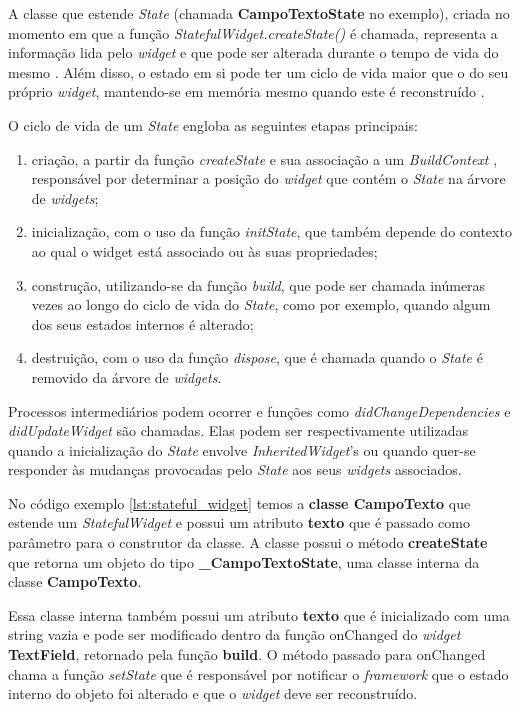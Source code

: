 A classe que estende \textit{State} (chamada \textbf{CampoTextoState} no exemplo), criada no momento em que a função \textit{StatefulWidget.createState()} é chamada, representa a informação lida pelo \textit{widget} e que pode ser alterada durante o tempo de vida do mesmo \cite{flutter2022stateful}. Além disso, o estado em si pode ter um ciclo de vida maior que o do seu próprio \textit{widget}, mantendo-se em memória mesmo quando este é reconstruído \cite{Faust2020}.

O ciclo de vida de um \textit{State} engloba as seguintes etapas principais:

\begin{enumerate}
  \item criação, a partir da função \textit{createState} e sua associação a um \textit{BuildContext} \cite{flutter2022buildcontext}, responsável por determinar a posição do \textit{widget} que contém o \textit{State} na árvore de \textit{widgets};
  \item inicialização, com o uso da função \textit{initState}, que também depende do contexto ao qual o widget está associado ou às suas propriedades;
  \item construção, utilizando-se da função \textit{build}, que pode ser chamada inúmeras vezes ao longo do ciclo de vida do \textit{State}, como por exemplo, quando algum dos seus estados internos é alterado;
  \item destruição, com o uso da função \textit{dispose}, que é chamada quando o \textit{State} \cite{flutter2022state} é removido da árvore de \textit{widgets}.
\end{enumerate}

Processos intermediários podem ocorrer e funções como \textit{didChangeDependencies} e \textit{didUpdateWidget} são chamadas. Elas podem ser respectivamente utilizadas quando a inicialização do \textit{State} envolve \textit{InheritedWidget}'s ou quando quer-se responder às mudanças provocadas pelo \textit{State} aos seus \textit{widgets} associados.

No código exemplo \ref{lst:stateful_widget} temos a \textbf{classe CampoTexto} que estende um \textit{StatefulWidget} e possui um atributo \textbf{texto} que é passado como parâmetro para o construtor da classe. A classe possui o método \textbf{createState} que retorna um objeto do tipo \textbf{\_CampoTextoState}, uma classe interna da classe \textbf{CampoTexto}.

Essa classe interna também possui um atributo \textbf{texto} que é inicializado com uma string vazia e pode ser modificado dentro da função onChanged do \textit{widget} \textbf{TextField}, retornado pela função \textbf{build}. O método passado para onChanged chama a função \textit{setState} que é responsável por notificar o \textit{framework} que o estado interno do objeto foi alterado e que o \textit{widget} deve ser reconstruído.


